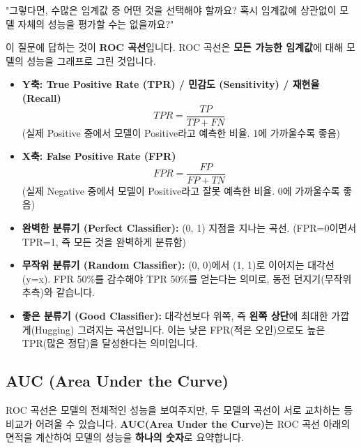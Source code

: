 \documentclass[11pt,a4paper]{book}
\theoremstyle{definition}
\begin{document}
"그렇다면, 수많은 임계값 중 어떤 것을 선택해야 할까요? 혹시 임계값에 상관없이 모델 자체의 성능을 평가할 수는 없을까요?"

이 질문에 답하는 것이 \textbf{ROC 곡선}입니다.
ROC 곡선은 \textbf{모든 가능한 임계값}에 대해 모델의 성능을 그래프로 그린 것입니다.

\begin{itemize}
    \item \textbf{Y축: True Positive Rate (TPR) / 민감도 (Sensitivity) / 재현율 (Recall)}
    $$ TPR = \frac{TP}{TP + FN} $$
    (실제 Positive 중에서 모델이 Positive라고 예측한 비율. 1에 가까울수록 좋음)
    
    \item \textbf{X축: False Positive Rate (FPR)}
    $$ FPR = \frac{FP}{FP + TN} $$
    (실제 Negative 중에서 모델이 Positive라고 잘못 예측한 비율. 0에 가까울수록 좋음)
\end{itemize}

\begin{summarybox}[title=ROC 곡선 해석하기]
\begin{itemize}
    \item \textbf{완벽한 분류기 (Perfect Classifier):}
    (0, 1) 지점을 지나는 곡선. (FPR=0이면서 TPR=1, 즉 모든 것을 완벽하게 분류함)
    
    \item \textbf{무작위 분류기 (Random Classifier):}
    (0, 0)에서 (1, 1)로 이어지는 대각선 (y=x).
    FPR 50\%를 감수해야 TPR 50\%를 얻는다는 의미로, 동전 던지기(무작위 추측)와 같습니다.
    
    \item \textbf{좋은 분류기 (Good Classifier):}
    대각선보다 위쪽, 즉 \textbf{왼쪽 상단}에 최대한 가깝게(Hugging) 그려지는 곡선입니다.
    이는 낮은 FPR(적은 오인)으로도 높은 TPR(많은 정답)을 달성한다는 의미입니다.
\end{itemize}
\end{summarybox}

\subsection{AUC (Area Under the Curve)}

ROC 곡선은 모델의 전체적인 성능을 보여주지만, 두 모델의 곡선이 서로 교차하는 등 비교가 어려울 수 있습니다.
\textbf{AUC(Area Under the Curve)}는 ROC 곡선 아래의 면적을 계산하여 모델의 성능을 \textbf{하나의 숫자}로 요약합니다.
\end{document}

